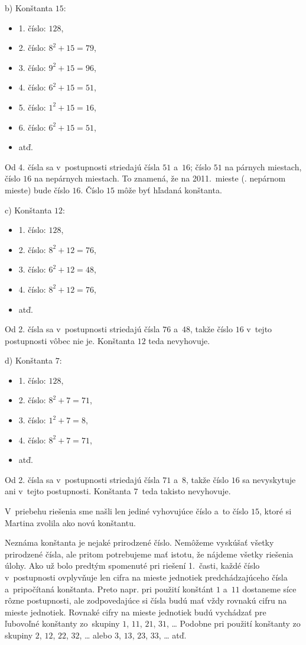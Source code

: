 {b) Konštanta $15$:
\begin{itemize}
  \item 1. číslo: $128$,
  \item 2. číslo: $8^2+15=79$,
  \item 3. číslo: $9^2+15=96$,
  \item 4. číslo: $6^2+15=51$,
  \item 5. číslo: $1^2+15=16$,
  \item 6. číslo: $6^2+15=51$,
  \item atď.
\end{itemize}
Od 4. čísla  sa v~postupnosti striedajú čísla $51$ a~$16$; číslo $51$ na párnych
miestach, číslo $16$ na nepárnych miestach.
To znamená, že na 2011.~mieste (\tj. nepárnom mieste) bude číslo $16$.
Číslo $15$ môže byť hľadaná konštanta.

c) Konštanta $12$:
\begin{itemize}
  \item 1. číslo: $128$,
  \item 2. číslo: $8^2+12=76$,
  \item 3. číslo: $6^2+12=48$,
  \item 4. číslo: $8^2+12=76$,
  \item atď.
\end{itemize}
Od 2. čísla sa v~postupnosti striedajú čísla $76$ a~$48$, takže číslo $16$ v~tejto
postupnosti vôbec nie je.
Konštanta $12$ teda nevyhovuje.

d) Konštanta $7$:
\begin{itemize}
  \item 1. číslo: $128$,
  \item 2. číslo: $8^2+7=71$,
  \item 3. číslo: $1^2+7=8$,
  \item 4. číslo: $8^2+7=71$,
  \item atď.
\end{itemize}
Od 2. čísla sa v~postupnosti striedajú čísla $71$ a~$8$, takže číslo $16$ sa
nevyskytuje ani v~tejto postupnosti. Konštanta $7$~teda takisto nevyhovuje.

\smallskip
V~priebehu riešenia sme našli len jediné vyhovujúce číslo a~to číslo $15$,
ktoré si Martina zvolila ako novú konštantu.


\medskip{}
Neznáma konštanta je nejaké prirodzené číslo.
Nemôžeme vyskúšať všetky prirodzené čísla, ale pritom potrebujeme mať
istotu, že nájdeme všetky riešenia úlohy.
Ako už bolo predtým spomenuté pri riešení 1.~časti, každé číslo v~postupnosti ovplyvňuje
len cifra na mieste jednotiek predchádzajúceho čísla a~pripočítaná konštanta.
Preto napr. pri použití konštánt $1$ a~$11$ dostaneme síce rôzne postupnosti,
ale zodpovedajúce si čísla budú mať vždy rovnakú cifru na mieste jednotiek.
Rovnaké cifry na mieste jednotiek budú vychádzať pre ľubovoľné konštanty zo~skupiny
$1$, $11$, $21$, $31$, \dots{}
Podobne pri použití konštanty zo skupiny $2$, $12$, $22$, $32$, \dots{} alebo $3$, $13$,
$23$, $33$, \dots{} atď.

}
